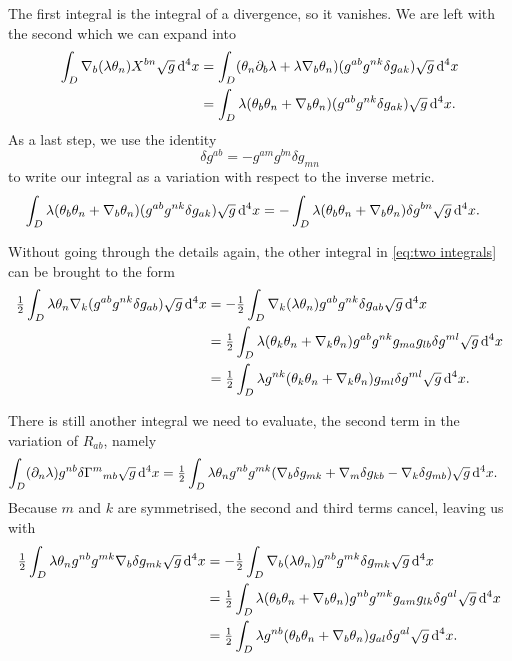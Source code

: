 \documentclass[../main.tex]{subfiles}
\begin{document}
The first integral is the integral of a divergence, so it vanishes. We are left with the
second which we can expand into
\begin{align*}
	\int_D \nabla_b(\lambda \theta_n) X^{bn}\sqrt{g}\,\mathrm{d}^4 x 
	& = \int_D (\theta_n \partial_b \lambda + \lambda \nabla_b\theta_n)(g^{ab}g^{nk}\delta
	g_{ak})\sqrt{g} \,\mathrm{d}^4 x \\
	& = \int_D \lambda(\theta_b\theta_n +
	\nabla_b\theta_n)(g^{ab}g^{nk}\delta g_{ak})\sqrt{g}\,\mathrm{d}^4 x.
\end{align*}
As a last step, we use the identity
\begin{equation*}
	\delta g^{ab} = - g^{am}g^{bn} \delta g_{mn}
\end{equation*}
to write our integral as a variation with respect to the inverse metric.
\begin{align*}
	\int_D \lambda(\theta_b\theta_n + \nabla_b\theta_n)(g^{ab}g^{nk}\delta
	g_{ak})\sqrt{g}\,\mathrm{d}^4 x 
	& = -\int_D \lambda(\theta_b\theta_n + \nabla_b \theta_n)\delta g^{bn} \sqrt{g} \,\mathrm{d}^4 x. 
\end{align*}

Without going through the details again, the other integral in \cref{eq:two integrals} can
be brought to the form
\begin{align*} 
	\tfrac{1}{2} \int_D \lambda \theta_n \nabla_k (g^{ab}g^{nk}\delta g_{ab}) \sqrt{g} \,\mathrm{d}^4
	x 
	& = - \tfrac{1}{2} \int_D \nabla_k(\lambda \theta_n) g^{ab}g^{nk}\delta g_{ab} \sqrt{g}
	\,\mathrm{d}^4 x \\
	& = \tfrac{1}{2} \int_D \lambda(\theta_k\theta_n + \nabla_k\theta_n) g^{ab}g^{nk}
	g_{ma}g_{lb}\delta g^{ml} \sqrt{g}\,\mathrm{d}^4 x \\
	& = \tfrac{1}{2}\int_D \lambda g^{nk}(\theta_k\theta_n + \nabla_k \theta_n)g_{ml} \delta
	g^{ml} \sqrt{g} \,\mathrm{d}^4 x.
\end{align*}

There is still another integral we need to evaluate, the second term in the variation of
\( R_{ab} \), namely
\begin{align}
	\int_D (\partial_n \lambda) g^{nb}\delta{\Gamma^m}_{mb} \sqrt{g} \,\mathrm{d}^4 x 
	& = \tfrac{1}{2} \int_D \lambda \theta_n g^{nb} g^{mk}(\nabla_b \delta g_{mk} + \nabla_m
	\delta g_{kb} - \nabla_k \delta g_{mb}) \sqrt{g} \,\mathrm{d}^4 x. 
\end{align}
Because \( m \) and \( k \) are symmetrised, the second and third terms cancel, leaving
us with
\begin{align}
	\tfrac{1}{2}\int_D \lambda \theta_n g^{nb}g^{mk}\nabla_b \delta g_{mk} \sqrt{g} \,\mathrm{d}^4 x
	& = - \tfrac{1}{2} \int_D \nabla_b(\lambda \theta_n) g^{nb}g^{mk} \delta g_{mk} \sqrt{g}
	\,\mathrm{d}^4 x \\
	& = \tfrac{1}{2} \int_D \lambda(\theta_b\theta_n + \nabla_b
	\theta_n)g^{nb}g^{mk}g_{am}g_{lk}\delta g^{al} \sqrt{g} \,\mathrm{d}^4 x \\
	& = \tfrac{1}{2} \int_D \lambda g^{nb}(\theta_b \theta_n + \nabla_b \theta_n)
	g_{al} \delta g^{al} \sqrt{g} \,\mathrm{d}^4 x. 
\end{align}
\end{document}
